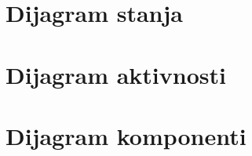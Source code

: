 			
			
			
			
			\eject
		
		\section{Dijagram stanja}
			
			
			
			
			
			\eject 
		
		\section{Dijagram aktivnosti}
			
			
			
			\eject
		\section{Dijagram komponenti}
		
		
